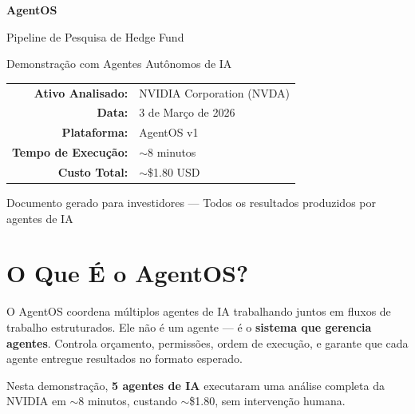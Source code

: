 \documentclass[11pt,a4paper]{article}
\begin{document}

\begin{titlepage}
\centering
\vspace*{4cm}
{\Huge\bfseries\color{accent} AgentOS\par}
\vspace{0.5cm}
{\Large Pipeline de Pesquisa de Hedge Fund\par}
\vspace{0.3cm}
{\large Demonstra\c{c}\~ao com Agentes Aut\^onomos de IA\par}
\vspace{2cm}
{\large\color{darkgray}
\begin{tabular}{rl}
\textbf{Ativo Analisado:} & NVIDIA Corporation (NVDA) \\
\textbf{Data:} & 3 de Mar\c{c}o de 2026 \\
\textbf{Plataforma:} & AgentOS v1 \\
\textbf{Tempo de Execu\c{c}\~ao:} & $\sim$8 minutos \\
\textbf{Custo Total:} & $\sim$\$1.80 USD \\
\end{tabular}
\par}
\vfill
{\small\color{darkgray} Documento gerado para investidores --- Todos os resultados produzidos por agentes de IA}
\end{titlepage}

\tableofcontents
\newpage


\section{O Que \'E o AgentOS?}

O AgentOS coordena m\'ultiplos agentes de IA trabalhando juntos em fluxos de trabalho estruturados. Ele n\~ao \'e um agente --- \'e o \textbf{sistema que gerencia agentes}. Controla or\c{c}amento, permiss\~oes, ordem de execu\c{c}\~ao, e garante que cada agente entregue resultados no formato esperado.

Nesta demonstra\c{c}\~ao, \textbf{5 agentes de IA} executaram uma an\'alise completa da NVIDIA em $\sim$8 minutos, custando $\sim$\$1.80, sem interven\c{c}\~ao humana.

\end{document}
